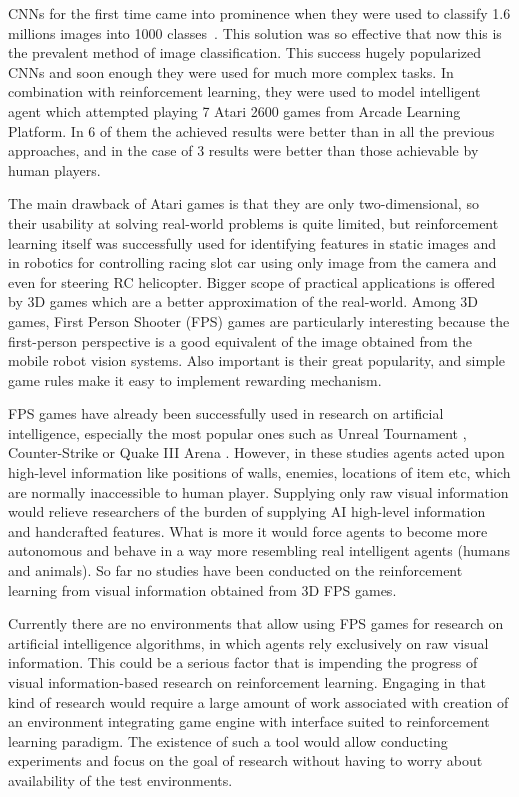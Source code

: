 \documentclass[english,bachelor,a4paper,twoside]{ppfcmthesis}
\begin{document}
CNNs for the first time came into prominence when they were used to classify 1.6 millions images into 1000 classes~\cite{NIPS2012_4824}.
This solution was so effective that now this is the prevalent method of image classification.
This success hugely popularized CNNs and soon enough they were used for much more complex tasks.
In combination with reinforcement learning, they were used to model intelligent agent which attempted playing 7 Atari 2600 games from Arcade Learning Platform\cite{mnih-atari-2013}.
In 6 of them the achieved results were better than in all the previous approaches, and in the case of 3 results were better than those achievable by human players.

The main drawback of Atari games is that they are only two-dimensional, so their usability at solving real-world problems is quite limited, but reinforcement learning itself was successfully used for identifying features in static images \cite{conf/cvpr/GoodrichA12} and in robotics for controlling racing slot car using only image from the camera \cite{rieijcnn12} and even for steering RC helicopter\cite{Abbeel07anapplication}.
Bigger scope of practical applications is offered by 3D games which are a better approximation of the real-world.
Among 3D games, First Person Shooter (FPS) games are particularly interesting because the first-person perspective is a good equivalent of the image obtained from the mobile robot vision systems.
Also important is their great popularity, and simple game rules make it easy to implement rewarding mechanism.

FPS games have already been successfully used in research on artificial intelligence, especially the most popular ones such as Unreal Tournament \cite{6314567} \cite{6922494}, Counter-Strike \cite{5035619} or Quake III Arena \cite{el2007hybrid}.
However, in these studies agents acted upon high-level information like positions of walls, enemies, locations of item etc, which are normally inaccessible to human player.
Supplying only raw visual information would relieve researchers of the burden of supplying AI high-level information and handcrafted features.
What is more it would force agents to become more autonomous and behave in a way more resembling real intelligent agents (humans and animals).
So far no studies have been conducted on the reinforcement learning from visual information obtained from 3D FPS games.


Currently there are no environments that allow using FPS games for research on artificial intelligence algorithms, in which agents rely exclusively on raw visual information.
This could be a serious factor that is impending the progress of visual information-based research on reinforcement learning.
Engaging in that kind of research would require a large amount of work associated with creation of an environment integrating game engine with interface suited to reinforcement learning paradigm.
The existence of such a tool would allow conducting experiments and focus on the goal of research without having to worry about availability of the test environments.
 
\end{document}
